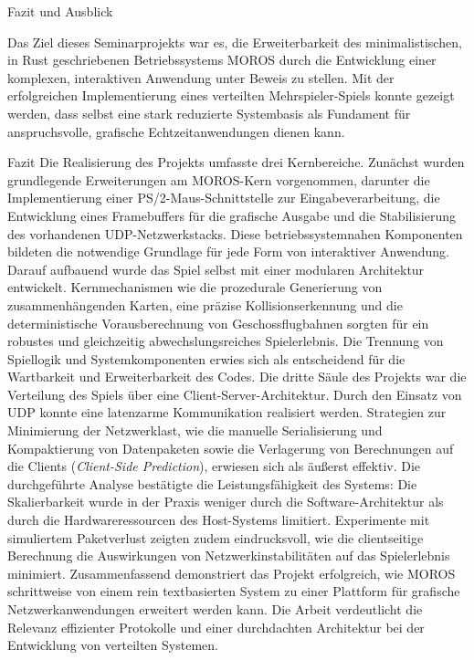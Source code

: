 \begin{section}{Fazit und Ausblick}

Das Ziel dieses Seminarprojekts war es, die Erweiterbarkeit des minimalistischen, in Rust geschriebenen Betriebssystems MOROS durch die Entwicklung einer komplexen, interaktiven Anwendung unter Beweis zu stellen.
Mit der erfolgreichen Implementierung eines verteilten Mehrspieler-Spiels konnte gezeigt werden, dass selbst eine stark reduzierte Systembasis als Fundament für anspruchsvolle, grafische Echtzeitanwendungen dienen kann.
\begin{subsection}{Fazit}
Die Realisierung des Projekts umfasste drei Kernbereiche.
Zunächst wurden grundlegende Erweiterungen am MOROS-Kern vorgenommen, darunter die Implementierung einer PS/2-Maus-Schnittstelle zur Eingabeverarbeitung, die Entwicklung eines Framebuffers für die grafische Ausgabe und die Stabilisierung des vorhandenen UDP-Netzwerkstacks.
Diese betriebssystemnahen Komponenten bildeten die notwendige Grundlage für jede Form von interaktiver Anwendung.
Darauf aufbauend wurde das Spiel selbst mit einer modularen Architektur entwickelt.
Kernmechanismen wie die prozedurale Generierung von zusammenhängenden Karten, eine präzise Kollisionserkennung und die deterministische Vorausberechnung von Geschossflugbahnen sorgten für ein robustes und gleichzeitig abwechslungsreiches Spielerlebnis.
Die Trennung von Spiellogik und Systemkomponenten erwies sich als entscheidend für die Wartbarkeit und Erweiterbarkeit des Codes.
Die dritte Säule des Projekts war die Verteilung des Spiels über eine Client-Server-Architektur.
Durch den Einsatz von UDP konnte eine latenzarme Kommunikation realisiert werden.
Strategien zur Minimierung der Netzwerklast, wie die manuelle Serialisierung und Kompaktierung von Datenpaketen sowie die Verlagerung von Berechnungen auf die Clients (\emph{Client-Side Prediction}), erwiesen sich als äußerst effektiv.
Die durchgeführte Analyse bestätigte die Leistungsfähigkeit des Systems: Die Skalierbarkeit wurde in der Praxis weniger durch die Software-Architektur als durch die Hardwareressourcen des Host-Systems limitiert.
Experimente mit simuliertem Paketverlust zeigten zudem eindrucksvoll, wie die clientseitige Berechnung die Auswirkungen von Netzwerkinstabilitäten auf das Spielerlebnis minimiert.
Zusammenfassend demonstriert das Projekt erfolgreich, wie MOROS schrittweise von einem rein textbasierten System zu einer Plattform für grafische Netzwerkanwendungen erweitert werden kann.
Die Arbeit verdeutlicht die Relevanz effizienter Protokolle und einer durchdachten Architektur bei der Entwicklung von verteilten Systemen.
\end{subsection}


\end{section}
